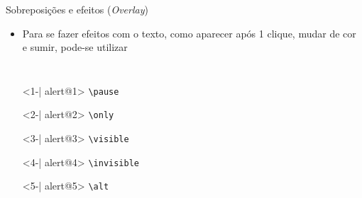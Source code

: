 \begin{frame}[fragile]{Sobreposições e efeitos (\textit{Overlay})}
    \begin{itemize}
    \item Para se fazer efeitos com o texto, como aparecer após 1 clique, mudar de cor e sumir, pode-se utilizar
    \end{itemize}

    \begin{columns}
        
        \begin{itemize}
        \item[]<1-| alert@1> \verb|\pause|
        \item[]<2-| alert@2> \verb|\only|
        \item[]<3-| alert@3> \verb|\visible|
        \item[]<4-| alert@4> \verb|\invisible|
        \item[]<5-| alert@5> \verb|\alt|
        \end{itemize}
        
           



\end{columns}
\end{frame}
